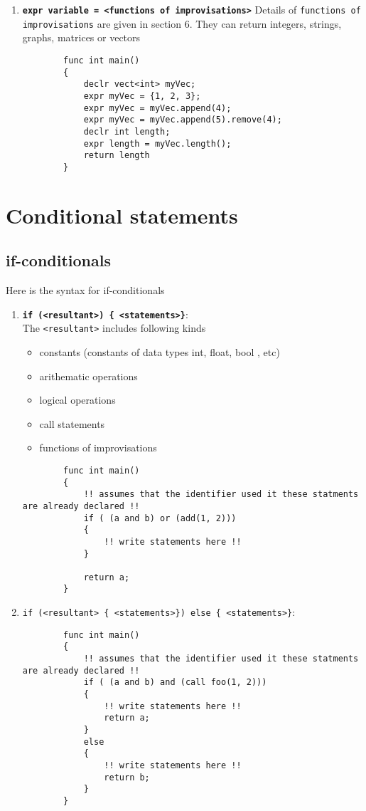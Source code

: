 \documentclass[journal, 18pt]{report}
\begin{document}
\begin{enumerate}
    \item \textbf{\texttt{expr variable = <functions of improvisations>}}
    Details of \texttt{functions of improvisations} are given in section 6. They can return integers, strings, graphs, matrices or vectors
    \begin{lstlisting}
        func int main()
        {
            declr vect<int> myVec;
            expr myVec = {1, 2, 3};
            expr myVec = myVec.append(4);
            expr myVec = myVec.append(5).remove(4);
            declr int length;
            expr length = myVec.length();
            return length
        }
    \end{lstlisting}
\end{enumerate}

\section{Conditional statements}
\subsection{if-conditionals}
Here is the syntax for if-conditionals
\begin{enumerate}
    \item \textbf{\texttt{if (<resultant>) \{ <statements>\}}}:\\
    The \texttt{<resultant>} includes following kinds 
    \begin{itemize}
        \item constants (constants of data types int, float, bool , etc)
        \item arithematic operations
        \item logical operations
        \item call statements
        \item functions of improvisations
    \end{itemize}
    \begin{lstlisting}
        func int main()
        {
            !! assumes that the identifier used it these statments are already declared !!
            if ( (a and b) or (add(1, 2)))
            {
                !! write statements here !!
            }

            return a;
        }
    \end{lstlisting}
    \item \texttt{\texttt{if (<resultant> \{ <statements>\})} else \{ <statements>\}}:\\
    \begin{lstlisting}
        func int main()
        {
            !! assumes that the identifier used it these statments are already declared !!
            if ( (a and b) and (call foo(1, 2)))
            {
                !! write statements here !!
                return a;
            }
            else 
            {
                !! write statements here !!
                return b;
            }
        }
    \end{lstlisting}
\end{enumerate}
\end{document}
